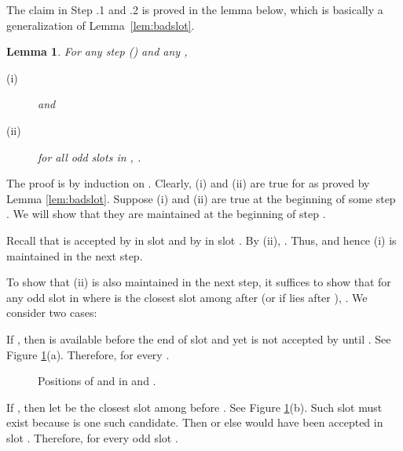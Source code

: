 \documentclass[11pt]{article}
\newtheorem{lemma}{Lemma}[section]
\newcommand{\qed}{\hspace*{\fill}\par\medskip}
\newenvironment{proof}{\noindent{\it Proof. }\ignorespaces}{\qed}
\begin{document}
The claim in Step .1 and .2 is proved in the lemma below,
which is basically a generalization of Lemma~\ref{lem:badslot}.

\begin{lemma} \label{lem:A-weights}
For any step  () and any , 
\begin{description}
\item[(i)]

and
\item[(ii)]
for all odd slots  in ,
.
\end{description}
\end{lemma}

\begin{proof}
The proof is by induction on .
Clearly, (i) and (ii) are true for 
as proved by Lemma \ref{lem:badslot}.
Suppose (i) and (ii) are true at the beginning
of some step .
We will show that they are maintained
at the beginning of step .

Recall that  is accepted by  in slot
 and by  in slot .
By (ii), .
Thus,  and hence
(i) is maintained in the next step.

To show that (ii) is also maintained in the next step,
it suffices to show that for any odd slot
 in 
where  is the closest slot among
 after 
(or  if  lies after ), 
.
We consider two cases:

If ,
then  is available before the end of slot  and yet
is not accepted by  until .
See Figure \ref{fig:induction}(a).
Therefore, 
for every .

\begin{figure}[h]
\centerline{ \epsfysize=5cm  }
\caption{Positions of  and  in  and .}
\label{fig:induction}
\end{figure}

If ,
then let  be the closest slot among
 before .
See Figure \ref{fig:induction}(b).
Such slot must exist because  is
one such candidate.
Then  or else  would
have been accepted in slot .
Therefore, 
for every odd slot .  
\end{proof}
\end{document}
